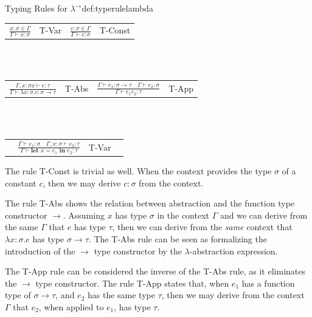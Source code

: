 \begin{definitiontitled}{Typing Rules for $\lambda^\rightarrow$}{def:typerulelambda}
\begin{tabularx}{\textwidth}{ X r X r}
\centering
$ \displaystyle
  \frac
    { x : \sigma \in \Gamma }
    { \Gamma \vdash x : \sigma }
$ & 
T-Var
&
\centering
$ \displaystyle
  \frac
    { c : \sigma \in \Gamma }
    { \Gamma \vdash c : \sigma }
$
&
T-Const
\\
\end{tabularx} \\
\\

\begin{tabularx}{\textwidth}{ X r X r}
\centering
$ \displaystyle
  \frac
    { \Gamma,x:\sigma x \vdash e : \tau }
    { \Gamma \vdash \lambda x:\sigma.e : \sigma \rightarrow \tau}
$
&
T-Abs
&
$ \displaystyle
  \frac
    { \Gamma \vdash e_1 : \sigma \rightarrow \tau \quad \Gamma \vdash e_2 : \sigma }
    { \Gamma \vdash e_1 e_2 : \tau }
$
& 
T-App
\\
\end{tabularx}\\
\\

\begin{tabularx}{\textwidth}{X r l X}
 &
$ \displaystyle
  \frac
    { \Gamma \vdash e_1 : \sigma \quad \Gamma,x:\sigma \vdash e_2 : \tau}
    { \Gamma \vdash \textbf{let } x=e_1 \textbf{ in } e_2 : \tau}
$ 
& 
T-Var
&
\\
\end{tabularx}
\end{definitiontitled}

The rule T-Const is trivial as well. 
When the context provides the type $\sigma$ of a constant $c$, then we may derive $c:\sigma$ from the context.

The rule T-Abs shows the relation between abstraction and the function type constructor $\rightarrow$.
Assuming $x$ has type $\sigma$ in the context $\Gamma$ and we can derive from the same $\Gamma$ that $e$ has type $\tau$, then we can derive from the \textit{same} context that $\lambda x:\sigma.e$ has type $\sigma \rightarrow \tau$.
The T-Abs rule can be seen as formalizing the introduction of the $\rightarrow$ type constructor by the $\lambda$-abstraction expression.

The T-App rule can be considered the inverse of the T-Abs rule, as it eliminates the $\rightarrow$ type constructor.
The rule T-App states that, when $e_1$ has a function type of $\sigma \rightarrow \tau$, and $e_2$ has the same type $\tau$, then we may derive from the context $\Gamma$ that $e_2$, when applied to $e_1$, has type $\tau$.

